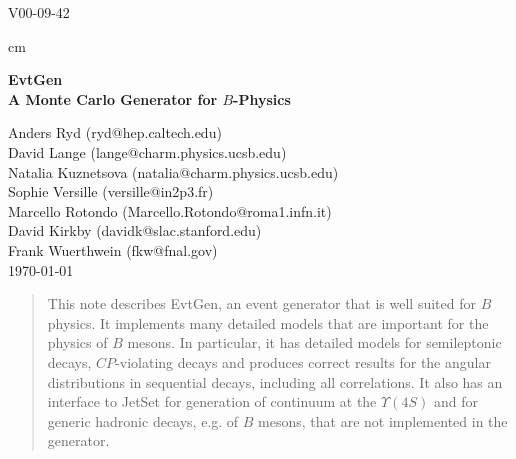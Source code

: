 %
%
\addtolength{\topmargin}{-0.75in}
\addtolength{\textwidth}{1.1in}
\addtolength{\textheight}{1.25in}
\addtolength{\hoffset}{-0.6in}


\makeindex



\begin{flushright}
V00-09-42
\end{flushright}

 cm


\begin{center}
\bf \Large {\bf EvtGen\\ 
A Monte Carlo Generator for $B$-Physics}
\end{center}

\begin{center}
Anders Ryd (ryd@hep.caltech.edu)\\
David Lange (lange@charm.physics.ucsb.edu)\\
Natalia Kuznetsova (natalia@charm.physics.ucsb.edu)\\
Sophie Versille (versille@in2p3.fr)\\
Marcello Rotondo (Marcello.Rotondo@roma1.infn.it)\\
David Kirkby (davidk@slac.stanford.edu)\\
Frank Wuerthwein (fkw@fnal.gov)\\
{\today} \\
\end{center}

\begin{abstract}
\smallskip
This note describes EvtGen, an event generator that 
is well suited for $B$ physics. It implements many
detailed models that are important for the
physics of $B$ mesons. In particular, it has detailed
models for semileptonic decays, $CP$-violating decays and
produces correct results for the angular distributions
in sequential decays, including all correlations.
It also has an interface to JetSet for generation of 
continuum at the $\Upsilon(4S)$ and for generic hadronic
decays, e.g. of $B$ mesons, that are not implemented in the
generator.   
\end{abstract}

\newpage

\tableofcontents

\newpage


\clearpage

\clearpage

\clearpage

\clearpage

\clearpage

%
\clearpage

\clearpage

\clearpage

\clearpage

\clearpage

\clearpage
\newpage

